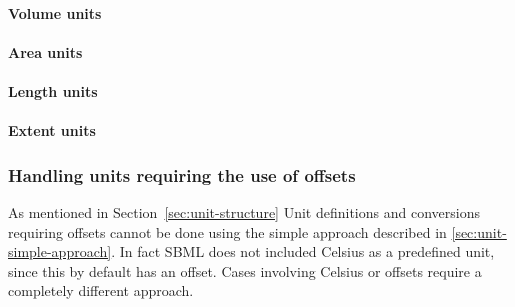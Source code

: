 \paragraph{Volume units}
\label{sec:bp:unitdefinitions:recommendedunits:volumeUnits}

\paragraph{Area units}
\label{sec:bp:unitdefinitions:recommendedunits:areaUnits}

\paragraph{Length units}
\label{sec:bp:unitdefinitions:recommendedunits:lengthUnits}

\paragraph{Extent units}
\label{sec:bp:unitdefinitions:recommendedunits:extentUnits}

\subsubsection{Handling units requiring the use of offsets}
\label{sec:bp:unitdefinitions:offset}

As mentioned in Section~\ref{sec:unit-structure} Unit definitions and conversions 
requiring offsets cannot be done using the simple approach described 
in \ref{sec:unit-simple-approach}.  In fact SBML does not included 
Celsius as a predefined unit, since this by default has an offset.
Cases involving Celsius or offsets require a completely
different approach.

